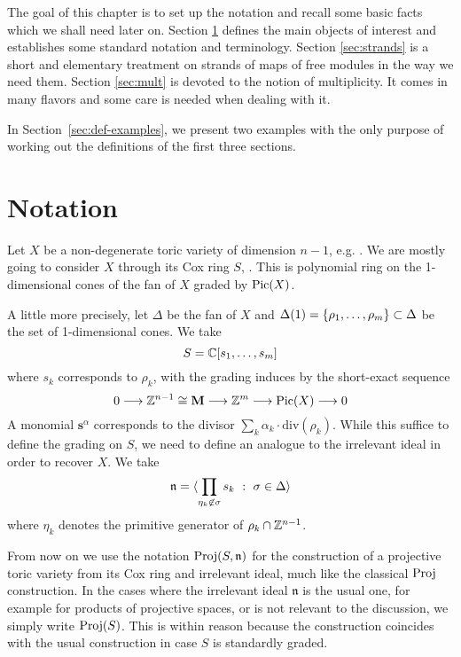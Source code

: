 \documentclass[fleqn,reqno]{amsart}
\begin{document}



\begin{paragraf*}
The goal of this chapter is to set up the notation and recall some basic facts
which we shall need later on.
Section \ref{sec:notation} defines the main objects of interest and establishes some
standard notation and terminology.
Section \ref{sec:strands} is a short and elementary treatment on strands of maps of free modules
in the way we need them.
Section \ref{sec:mult} is devoted to the notion of multiplicity.
It comes in many flavors and some care is needed when dealing with it.
\end{paragraf*}

\begin{paragraf*}
In Section~\ref{sec:def-examples},
we present two examples with the only purpose of working out
the definitions of the first three sections.
\end{paragraf*}



\section{Notation}
\label{sec:notation}

\begin{paragraf}
\label{par:cox-ring}
Let $X$ be a non-degenerate toric variety of dimension $n-1$, e.g. \citet{CLSh11}.
We are mostly going to consider $X$ through its Cox ring $S$, \citet{Cox-93}.
This is polynomial ring on the 1-dimensional cones of the fan of $X$
graded by $\operatorname{Pic}(X)$.

A little more precisely,
let $\Delta$ be the fan of $X$ and
$\Delta(1)=\{\rho_1,\ldots,\rho_m\}\subset\Delta$ be the set of 1-dimensional cones.
We take
\[
	S=\mathbb{C}[s_1,\ldots,s_m]
\]
where $s_k$ corresponds to $\rho_k$,
with the grading induces by the short-exact sequence
\[
	0\longrightarrow\mathbb{Z}^{n-1}\cong\mathbf M\longrightarrow\mathbb{Z}^m\longrightarrow\operatorname{Pic}(X)\longrightarrow0
\]
A monomial $\mathbf s^\alpha$ corresponds to the divisor $\sum_k \alpha_k\cdot\text{div}(\rho_k)$.
While this suffice to define the grading on $S$,
we need to define an analogue to the irrelevant ideal in order to recover $X$.
We take
\[
	\mathfrak{n}=\langle \prod_{\eta_k\not\in\sigma}s_k~:~\sigma\in\Delta\rangle
\]
where $\eta_k$ denotes the primitive generator of $\rho_k\cap\mathbb{Z}^{n-1}$.
\end{paragraf}

\begin{paragraf}
From now on we use the notation $\operatorname{Proj}(S,\mathfrak n)$
for the construction of a projective toric variety from its Cox ring and irrelevant ideal,
much like the classical $\operatorname{Proj}$ construction.
In the cases where the irrelevant ideal $\mathfrak n$ is the usual one,
for example for products of projective spaces, or is not relevant to the discussion,
we simply write $\operatorname{Proj}(S)$.
This is within reason because the construction coincides with the usual construction
in case $S$ is standardly graded.
\end{paragraf}
\end{document}
